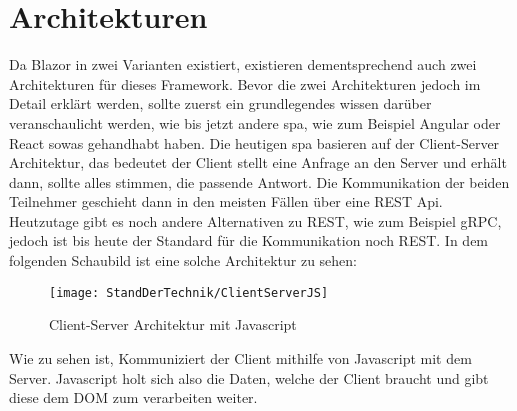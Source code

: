 \section{Architekturen}
\label{subsec:architekturen}
Da Blazor in zwei Varianten existiert, existieren dementsprechend auch zwei Architekturen für
dieses Framework. Bevor die zwei Architekturen jedoch im Detail erklärt werden, sollte zuerst ein
grundlegendes wissen darüber veranschaulicht werden, wie bis jetzt andere \ac{spa}, wie zum
Beispiel Angular oder React sowas gehandhabt haben. Die heutigen \ac{spa} basieren auf der
Client-Server Architektur, das bedeutet der Client stellt eine Anfrage an den Server und erhält
dann, sollte alles stimmen, die passende Antwort. Die Kommunikation der beiden Teilnehmer
geschieht dann in den meisten Fällen über eine REST Api. Heutzutage gibt es noch andere
Alternativen zu REST, wie zum Beispiel gRPC, jedoch ist bis heute der Standard für die
Kommunikation noch REST.
In dem folgenden Schaubild ist eine solche Architektur zu sehen:
\begin{figure}[h]
    \centering
    \texttt{[image: StandDerTechnik/ClientServerJS]}
    \caption[Client-Server Architektur mit Javascript]{Client-Server Architektur mit Javascript}
    \label{img:clientserverjs}
\end{figure}

Wie zu sehen ist, Kommuniziert der Client mithilfe von Javascript mit dem Server. Javascript holt
sich also die Daten, welche der Client braucht und gibt diese dem DOM zum verarbeiten weiter.

